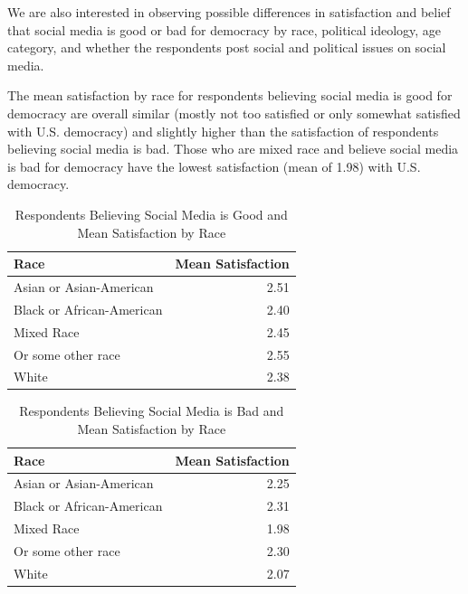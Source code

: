 \documentclass[
]{article}
\begin{document}
We are also interested in observing possible differences in satisfaction
and belief that social media is good or bad for democracy by race,
political ideology, age category, and whether the respondents post
social and political issues on social media.

The mean satisfaction by race for respondents believing social media is
good for democracy are overall similar (mostly not too satisfied or only
somewhat satisfied with U.S. democracy) and slightly higher than the
satisfaction of respondents believing social media is bad. Those who are
mixed race and believe social media is bad for democracy have the lowest
satisfaction (mean of 1.98) with U.S. democracy.

\begin{table}[ht]
\centering
\caption{Respondents Believing Social Media is Good
             and Mean Satisfaction by Race} 
\begin{tabular}{lr}
  \hline
Race & Mean Satisfaction \\ 
  \hline
Asian or Asian-American & 2.51 \\ 
  Black or African-American & 2.40 \\ 
  Mixed Race & 2.45 \\ 
  Or some other race & 2.55 \\ 
  White & 2.38 \\ 
   \hline
\end{tabular}
\end{table}
\begin{table}[ht]
\centering
\caption{Respondents Believing Social Media is Bad
             and Mean Satisfaction by Race} 
\begin{tabular}{lr}
  \hline
Race & Mean Satisfaction \\ 
  \hline
Asian or Asian-American & 2.25 \\ 
  Black or African-American & 2.31 \\ 
  Mixed Race & 1.98 \\ 
  Or some other race & 2.30 \\ 
  White & 2.07 \\ 
   \hline
\end{tabular}
\end{table}
\end{document}
